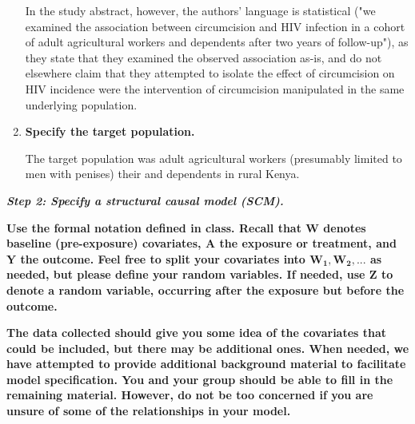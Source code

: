 \documentclass{article}
\begin{document}
\begin{enumerate}[label=\textbf{(\alph*)}]
  In the study abstract, however, the authors' language is statistical ("we examined the association between circumcision and HIV infection in a cohort of adult agricultural workers and dependents after two years of follow-up"), as they state that they examined the observed association as-is, and do not elsewhere claim that they attempted to isolate the effect of circumcision on HIV incidence were the intervention of circumcision manipulated in the same underlying population.
  
  \item \textbf{Specify the target population.}
  
  The target population was adult agricultural workers (presumably limited to men with penises) their and dependents in rural Kenya.

\end{enumerate}

\pagebreak

\textbf{\textit{Step 2: Specify a structural causal model (SCM).}}

\vspace{2mm}

\textbf{Use the formal notation defined in class. Recall that $\bm{W}$ denotes baseline (pre-exposure) covariates, $\bm{A}$ the exposure or treatment, and $\bm{Y}$ the outcome. Feel free to split your covariates into $\bm{W_1, W_2, ...}$ as needed, but please define your random variables. If needed, use $\bm{Z}$ to denote a random variable, occurring after the exposure but before the outcome.}

\vspace{2mm}

\textbf{The data collected should give you some idea of the covariates that could be included, but there may be additional ones. When needed, we have attempted to provide additional background material to facilitate model specification. You and your group should be able to fill in the remaining material. However, do not be too concerned if you are unsure of some of the relationships in your model.}
\end{document}
